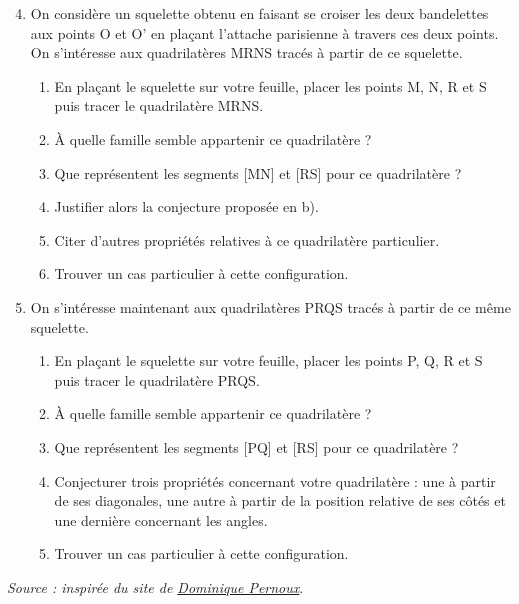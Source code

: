 \begin{activite}
\begin{QCM}
         \begin{enumerate}
         \setcounter{enumi}{3}
            \item On considère un squelette obtenu en faisant se croiser les deux bandelettes aux points O et O' en plaçant l'attache parisienne à travers ces deux points. On s'intéresse aux quadrilatères MRNS tracés à partir de ce squelette.
            \begin{enumerate}
               \item En plaçant le squelette sur votre feuille, placer les points M, N, R et S puis tracer le quadrilatère MRNS.
               \item À quelle famille semble appartenir ce quadrilatère ?
               \item Que représentent les segments [MN] et [RS] pour ce quadrilatère ?
               \item Justifier alors la conjecture proposée en b).
               \item Citer d'autres propriétés relatives à ce quadrilatère particulier.
               \item Trouver un cas particulier à cette configuration.
            \end{enumerate}
            \item On s'intéresse maintenant aux quadrilatères PRQS tracés à partir de ce même squelette.
            \begin{enumerate}
               \item En plaçant le squelette sur votre feuille, placer les points P, Q, R et S puis tracer le quadrilatère PRQS.
               \item À quelle famille semble appartenir ce quadrilatère ?
               \item Que représentent les segments [PQ] et [RS] pour ce quadrilatère ?
               \item Conjecturer trois propriétés concernant votre quadrilatère : une à partir de ses diagonales, une autre à partir de la position relative de ses côtés et une dernière concernant les angles.
                \item Trouver un cas particulier à cette configuration.
            \end{enumerate}
      \end{enumerate}
\end{QCM}
  
     \vfill\hfill{\it\footnotesize Source : inspirée du site de \href{http://pernoux.pagesperso-orange.fr/revision/revgeo.pdf}{Dominique Pernoux}}.
\end{activite}


